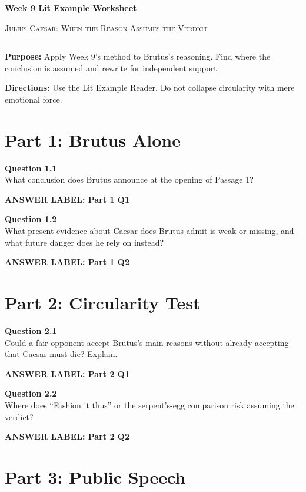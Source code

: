 \documentclass[12pt]{article}
\newcommand{\answerbox}[2]{%
\vspace{0.12em}
\noindent\textbf{#1}\par
\vspace{0.04em}
\noindent\fbox{%
\begin{minipage}[t][#2]{\dimexpr\textwidth-2\fboxsep-2\fboxrule}
\rule{\textwidth}{0pt}
\vspace{#2}
\end{minipage}}
\par\vspace{0.22em}}
\begin{document}
\begin{center}
{\LARGE\bfseries Week 9 Lit Example Worksheet}\par\vspace{0.05em}
{\large\scshape Julius Caesar: When the Reason Assumes the Verdict}\par\vspace{0.12em}
\rule{0.78\textwidth}{0.5pt}
\end{center}

\textbf{Purpose:} Apply Week 9's method to Brutus's reasoning. Find where the conclusion is assumed and rewrite for independent support.

\textbf{Directions:} Use the Lit Example Reader. Do not collapse circularity with mere emotional force.

\section*{Part 1: Brutus Alone}

\textbf{Question 1.1}\\[-0.15em]
What conclusion does Brutus announce at the opening of Passage 1?

\answerbox{ANSWER LABEL: Part 1 Q1}{2.0in}

\textbf{Question 1.2}\\[-0.15em]
What present evidence about Caesar does Brutus admit is weak or missing, and what future danger does he rely on instead?

\answerbox{ANSWER LABEL: Part 1 Q2}{2.45in}

\newpage

\section*{Part 2: Circularity Test}

\textbf{Question 2.1}\\[-0.15em]
Could a fair opponent accept Brutus's main reasons without already accepting that Caesar must die? Explain.

\answerbox{ANSWER LABEL: Part 2 Q1}{2.45in}

\textbf{Question 2.2}\\[-0.15em]
Where does ``Fashion it thus'' or the serpent's-egg comparison risk assuming the verdict?

\answerbox{ANSWER LABEL: Part 2 Q2}{2.35in}

\newpage

\section*{Part 3: Public Speech}
\end{document}
